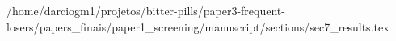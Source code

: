 /home/darciogm1/projetos/bitter-pills/paper3-frequent-losers/papers_finais/paper1_screening/manuscript/sections/sec7_results.tex